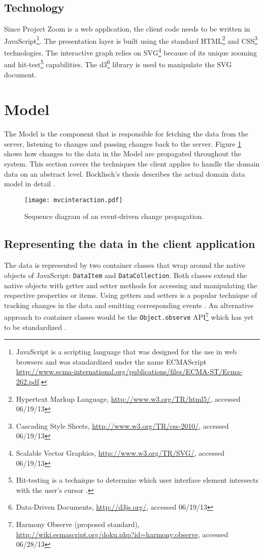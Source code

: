 \subsection{Technology}
Since Project Zoom is a web application, the client code needs to be written in JavaScript\footnote{JavaScript is a scripting language that was designed for the use in web browsers and was standardized under the name ECMAScript \url{http://www.ecma-international.org/publications/files/ECMA-ST/Ecma-262.pdf}.}. The presentation layer is built using the standard HTML\footnote{Hypertext Markup Language, \url{http://www.w3.org/TR/html5/}, accessed 06/19/13} and CSS\footnote{Cascading Style Sheets, \url{http://www.w3.org/TR/css-2010/}, accessed 06/19/13} technologies. The interactive graph relies on SVG\footnote{Scalable Vector Graphics, \url{http://www.w3.org/TR/SVG/}, accessed 06/19/13} because of its unique zooming and hit-test\footnote{Hit-testing is a technique to determine which user interface element intersects with the user's cursor \cite{Foley_1995}.} capabilities. The d3\footnote{Data-Driven Documents, \url{http://d3js.org/}, accessed 06/19/13} library is used to manipulate the SVG document.

\section{Model}

The Model is the component that is responsible for fetching the data from the server, listening to changes and passing changes back to the server. Figure \ref{fig:modelinteraction} shows how changes to the data in the Model are propagated throughout the system. This section covers the techniques the client applies to handle the domain data on an abstract level. Bocklisch's thesis describes the actual domain data model in detail \cite{Bocklisch_2013}.


\begin{figure}
\texttt{[image: mvcinteraction.pdf]}
\caption{Sequence diagram of an event-driven change propagation.}
\label{fig:modelinteraction}
\end{figure}



\subsection{Representing the data in the client application}

The data is represented by two container classes that wrap around the native objects of Ja\-va\-Script: \texttt{DataItem} and \texttt{DataCollection}. Both classes extend the native objects with getter and setter methods for accessing and manipulating the respective properties or items. Using getters and setters is a popular technique of tracking changes in the data and emitting corresponding events \cite{Osmani_2013}. An alternative approach to container classes would be the \texttt{Object.observe} API\footnote{Harmony Observe (proposed standard), \url{http://wiki.ecmascript.org/doku.php?id=harmony:observe}, accessed 06/28/13} which has yet to be standardized \cite{Waldron_2012}.

